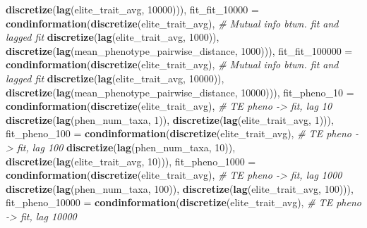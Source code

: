 \documentclass[]{book}
\newenvironment{Shaded}{\begin{snugshade}}{\end{snugshade}}
\newcommand{\CommentTok}[1]{\textcolor[rgb]{0.56,0.35,0.01}{\textit{#1}}}
\newcommand{\DataTypeTok}[1]{\textcolor[rgb]{0.13,0.29,0.53}{#1}}
\newcommand{\DecValTok}[1]{\textcolor[rgb]{0.00,0.00,0.81}{#1}}
\newcommand{\KeywordTok}[1]{\textcolor[rgb]{0.13,0.29,0.53}{\textbf{#1}}}
\newcommand{\NormalTok}[1]{#1}
\begin{document}
\begin{Shaded}
\begin{Highlighting}[]
{                                     \KeywordTok{discretize}\NormalTok{(}\KeywordTok{lag}\NormalTok{(elite_trait_avg, }\DecValTok{10000}\NormalTok{))),  }
  \DataTypeTok{fit_fit_10000 =}    \KeywordTok{condinformation}\NormalTok{(}\KeywordTok{discretize}\NormalTok{(elite_trait_avg), }\CommentTok{# Mutual info btwn. fit and lagged fit}
                                     \KeywordTok{discretize}\NormalTok{(}\KeywordTok{lag}\NormalTok{(elite_trait_avg, }\DecValTok{1000}\NormalTok{)), }
                                     \KeywordTok{discretize}\NormalTok{(}\KeywordTok{lag}\NormalTok{(mean_phenotype_pairwise_distance, }\DecValTok{1000}\NormalTok{))),}
  \DataTypeTok{fit_fit_100000 =}   \KeywordTok{condinformation}\NormalTok{(}\KeywordTok{discretize}\NormalTok{(elite_trait_avg), }\CommentTok{# Mutual info btwn. fit and lagged fit}
                                     \KeywordTok{discretize}\NormalTok{(}\KeywordTok{lag}\NormalTok{(elite_trait_avg, }\DecValTok{10000}\NormalTok{)), }
                                     \KeywordTok{discretize}\NormalTok{(}\KeywordTok{lag}\NormalTok{(mean_phenotype_pairwise_distance, }\DecValTok{10000}\NormalTok{))),  }
  \DataTypeTok{fit_pheno_10 =}     \KeywordTok{condinformation}\NormalTok{(}\KeywordTok{discretize}\NormalTok{(elite_trait_avg), }\CommentTok{# TE pheno -> fit, lag 10}
                                     \KeywordTok{discretize}\NormalTok{(}\KeywordTok{lag}\NormalTok{(phen_num_taxa, }\DecValTok{1}\NormalTok{)), }
                                     \KeywordTok{discretize}\NormalTok{(}\KeywordTok{lag}\NormalTok{(elite_trait_avg, }\DecValTok{1}\NormalTok{))),}
  \DataTypeTok{fit_pheno_100 =}    \KeywordTok{condinformation}\NormalTok{(}\KeywordTok{discretize}\NormalTok{(elite_trait_avg),  }\CommentTok{# TE pheno -> fit, lag 100 }
                                     \KeywordTok{discretize}\NormalTok{(}\KeywordTok{lag}\NormalTok{(phen_num_taxa, }\DecValTok{10}\NormalTok{)), }
                                     \KeywordTok{discretize}\NormalTok{(}\KeywordTok{lag}\NormalTok{(elite_trait_avg, }\DecValTok{10}\NormalTok{))),}
  \DataTypeTok{fit_pheno_1000 =}   \KeywordTok{condinformation}\NormalTok{(}\KeywordTok{discretize}\NormalTok{(elite_trait_avg),  }\CommentTok{# TE pheno -> fit, lag 1000}
                                     \KeywordTok{discretize}\NormalTok{(}\KeywordTok{lag}\NormalTok{(phen_num_taxa, }\DecValTok{100}\NormalTok{)), }
                                     \KeywordTok{discretize}\NormalTok{(}\KeywordTok{lag}\NormalTok{(elite_trait_avg, }\DecValTok{100}\NormalTok{))),}
  \DataTypeTok{fit_pheno_10000 =}  \KeywordTok{condinformation}\NormalTok{(}\KeywordTok{discretize}\NormalTok{(elite_trait_avg),  }\CommentTok{# TE pheno -> fit, lag 10000}
}
\end{Highlighting}
\end{Shaded}
\end{document}
